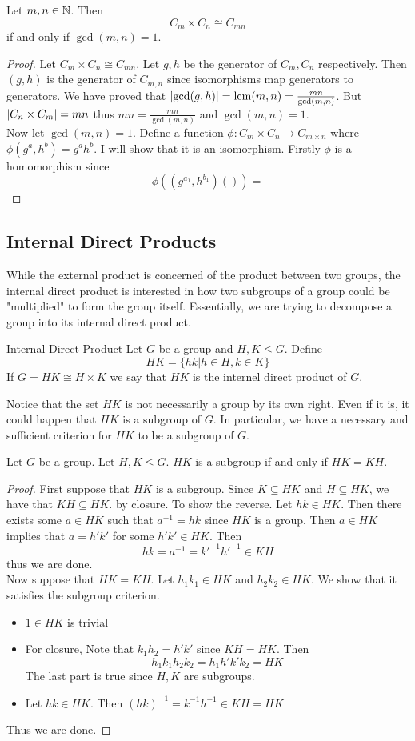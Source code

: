 \documentclass[a4paper]{article}
\begin{document}
\begin{prp}{}{} Let $m,n\in\mathbb{N}$. Then $$C_m\times C_n\cong C_{mn}$$ if and only if $\gcd(m,n)=1$. 
\begin{proof}
Let $C_m\times C_n\cong C_{mn}$. Let $g,h$ be the generator of $C_m,C_n$ respectively. Then $(g,h)$ is the generator of $C_{m,n}$ since isomorphisms map generators to generators. We have proved that $\abs{\gcd(g,h)}=\operatorname{lcm}(m,n)=\frac{mn}{\gcd(m,n)}$. But $\abs{C_n\times C_m}=mn$ thus $mn=\frac{mn}{\gcd(m,n)}$ and $\gcd(m,n)=1$. \\
Now let $\gcd(m,n)=1$. Define a function $\phi:C_m\times C_n\to C_{m\times n}$ where $\phi(g^a,h^b)=g^ah^b$. I will show that it is an isomorphism. Firstly $\phi$ is a homomorphism since $$\phi((g^{a_1},h^{b_1})())=$$
\end{proof}
\end{prp}

\subsection{Internal Direct Products}
While the external product is concerned of the product between two groups, the internal direct product is interested in how two subgroups of a group could be "multiplied" to form the group itself. Essentially, we are trying to decompose a group into its internal direct product. 

\begin{defn}{Internal Direct Product}{} Let $G$ be a group and $H,K\leq G$. Define $$HK=\{hk|h\in H,k\in K\}$$ If $G=HK\cong H\times K$ we say that $HK$ is the internel direct product of $G$. 
\end{defn}

Notice that the set $HK$ is not necessarily a group by its own right. Even if it is, it could happen that $HK$ is a subgroup of $G$. In particular, we have a necessary and sufficient criterion for $HK$ to be a subgroup of $G$. 

\begin{thm}{}{} Let $G$ be a group. Let $H,K\leq G$. $HK$ is a subgroup if and only if $HK=KH$. 
\begin{proof}
First suppose that $HK$ is a subgroup. Since $K\subseteq HK$ and $H\subseteq HK$, we have that $KH\subseteq HK$. by closure. To show the reverse. Let $hk\in HK$. Then there exists some $a\in HK$ such that $a^{-1}=hk$ since $HK$ is a group. Then $a\in HK$ implies that $a=h'k'$ for some $h'k'\in HK$. Then $$hk=a^{-1}=k'^{-1}h'^{-1}\in KH$$ thus we are done. \\
Now suppose that $HK=KH$. Let $h_1k_1\in HK$ and $h_2k_2\in HK$. We show that it satisfies the subgroup criterion. 
\begin{itemize}
\item $1\in HK$ is trivial
\item For closure, Note that $k_1h_2=h'k'$ since $KH=HK$. Then $$h_1k_1h_2k_2=h_1h'k'k_2=HK$$ The last part is true since $H,K$ are subgroups. 
\item Let $hk\in HK$. Then $(hk)^{-1}=k^{-1}h^{-1}\in KH=HK$
\end{itemize}
Thus we are done. 
\end{proof}
\end{thm}
\end{document}
